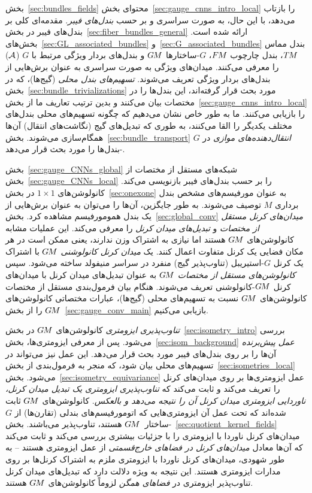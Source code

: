 بخش~\ref{sec:bundles_fields} محتوای بخش~\ref{sec:gauge_cnns_intro_local} را بازتاب می‌دهد، با این حال، به صورت سراسری و بر حسب \emph{بندل‌های فیبر}.
مقدمه‌ای کلی بر بندل‌های فیبر در بخش~\ref{sec:fiber_bundles_general} ارائه شده است.
بخش‌های~\ref{sec:GL_associated_bundles} و~\ref{sec:G_associated_bundles} بندل مماس $T\mkern-1.5muM$، بندل چارچوب $F\mkern-1.5muM$، $G$-ساختارها $G\mkern-1.4muM$ و بندل‌های بردار ویژگی مرتبط با $G$ ($\mathcal{A}$) را معرفی می‌کنند.
میدان‌های ویژگی به صورت سراسری به عنوان برش‌هایی از بندل‌های بردار ویژگی تعریف می‌شوند.
\emph{تسهیم‌های بندل محلی} (گیج‌ها)، که در بخش~\ref{sec:bundle_trivializations} مورد بحث قرار گرفته‌اند، این بندل‌ها را در مختصات بیان می‌کنند و بدین ترتیب تعاریف ما از بخش~\ref{sec:gauge_cnns_intro_local} را بازیابی می‌کنند.
ما به طور خاص نشان می‌دهیم که چگونه تسهیم‌های محلی بندل‌های مختلف یکدیگر را القا می‌کنند، به طوری که تبدیل‌های گیج (نگاشت‌های انتقال) آن‌ها همگام‌سازی می‌شوند.
بخش~\ref{sec:bundle_transport} \emph{انتقال‌دهنده‌های موازی} در $G$-بندل‌ها را مورد بحث قرار می‌دهد.

بخش~\ref{sec:gauge_CNNs_global} شبکه‌های مستقل از مختصات از بخش~\ref{sec:gauge_CNNs_local} را بر حسب بندل‌های فیبر بازنویسی می‌کند.
کانولوشن‌های $1\times1$ در بخش~\ref{sec:onexone} به عنوان مورفیسم‌های مشخص بندل برداری $M$ توصیف می‌شوند.
به طور جایگزین، آن‌ها را می‌توان به عنوان برش‌هایی از یک بندل همومورفیسم مشاهده کرد.
بخش~\ref{sec:global_conv} \emph{میدان‌های کرنل مستقل از مختصات} و \emph{تبدیل‌های میدان کرنل} را معرفی می‌کند.
این عملیات مشابه کانولوشن‌های $G\mkern-1.4muM$ هستند اما نیازی به اشتراک وزن ندارند، یعنی ممکن است در هر مکان فضایی یک کرنل متفاوت اعمال کنند.
یک \emph{میدان کرنل کانولوشنی} $G\mkern-1.4muM$ با اشتراک یک کرنل $G$-استیریبل (تناوب‌پذیر گیج) منفرد در سراسر منیفولد ساخته می‌شود.
سپس \emph{کانولوشن‌های مستقل از مختصات} $G\mkern-1.4muM$ به عنوان تبدیل‌های میدان کرنل با میدان‌های کرنل $G\mkern-1.4muM$-کانولوشنی تعریف می‌شوند.
هنگام بیان فرمول‌بندی مستقل از مختصات کانولوشن‌های $G\mkern-1.4muM$ نسبت به تسهیم‌های محلی (گیج‌ها)، عبارات مختصاتی کانولوشن‌های $G\mkern-1.4muM$ را از بخش~\ref{sec:gauge_conv_main} بازیابی می‌کنیم.

\emph{تناوب‌پذیری ایزومتری} کانولوشن‌های $G\mkern-1.4muM$ در بخش~\ref{sec:isometry_intro} بررسی می‌شود.
پس از معرفی ایزومتری‌ها، بخش~\ref{sec:isom_background} \emph{عمل پیش‌برنده} آن‌ها را بر روی بندل‌های فیبر مورد بحث قرار می‌دهد.
این عمل نیز می‌تواند در تسهیم‌های محلی بیان شود، که منجر به فرمول‌بندی از بخش~\ref{sec:isometries_local} می‌شود.
بخش~\ref{sec:isometry_equivariance} عمل ایزومتری‌ها بر روی میدان‌های کرنل را تعریف می‌کند و ثابت می‌کند که \emph{تناوب‌پذیری ایزومتری یک تبدیل میدان کرنل، ناوردایی ایزومتری میدان کرنل آن را نتیجه می‌دهد و بالعکس}.
کانولوشن‌های $G\mkern-1.4muM$ ثابت شده‌اند که تحت عمل آن ایزومتری‌هایی که اتومورفیسم‌های بندلی (تقارن‌ها) از $G$-ساختار~$G\mkern-1.4muM$ هستند، تناوب‌پذیر می‌باشند.
بخش~\ref{sec:quotient_kernel_fields} میدان‌های کرنل ناوردا با ایزومتری را با جزئیات بیشتری بررسی می‌کند و ثابت می‌کند که آن‌ها معادل \emph{میدان‌های کرنل در فضاهای خارج‌قسمتی} از عمل ایزومتری هستند
-- به طور شهودی، میدان‌های کرنل ناوردا با ایزومتری ملزم به اشتراک کرنل‌ها بر روی مدارات ایزومتری هستند.
این نتیجه به ویژه دلالت دارد که تبدیل‌های میدان کرنل تناوب‌پذیر ایزومتری در \emph{فضاهای همگن} لزوماً کانولوشن‌های $G\mkern-1.4muM$ هستند.



